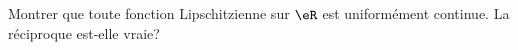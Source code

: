 
\begin{exercice}\label{exo0100}

Montrer que toute fonction Lipschitzienne sur $\eR$ est uniformément continue. La réciproque est-elle vraie? 

\end{exercice}
